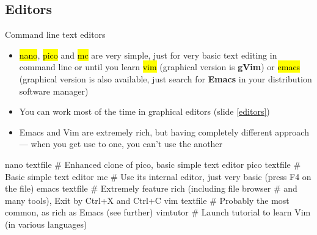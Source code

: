\documentclass[compress, ucs, xelatex, 11pt, xcolor=svgnames,
  hyperref={
    bookmarks=true,
    unicode=true,
    colorlinks=true,
    pdftitle={Linux, command line and MetaCentrum},
    plainpages=false,
    pdfauthor={Vojtech Zeisek},
    pdfsubject={Course about use of Linux command line, writing shell scripts and using MetaCentrum of CESNET},
    pdfcreator={XeLaTeX},
    pdfkeywords={Linux, GNU, BASH, shell, command line, MetaCentrum},
    linkcolor=DarkRed,
    anchorcolor=DarkBlue,
    citecolor=Indigo,
    filecolor=NavyBlue,
    menucolor=DarkMagenta,
    urlcolor=DarkBlue,
    pdftex},
  url={hyphens, lowtilde} %
  ]{beamer}
\renewcommand{\texttt}[1]{\hl{\ttfamily #1}}
\begin{document}
\subsection{Editors} 

\begin{frame}[fragile]{Command line text editors}
  \begin{itemize}
    \item \texttt{nano}, \texttt{pico} and \texttt{mc} are very simple, just for very basic text editing in command line or until you learn \texttt{vim} (graphical version is \textbf{gVim}) or \texttt{emacs} (graphical version is also available, just search for \textbf{Emacs} in your distribution software manager)
    \item You can work most of the time in graphical editors (slide \ref{editors})
    \item Emacs and Vim are extremely rich, but having completely different approach --- when you get use to one, you can't use the another
  \end{itemize}
  \begin{bashcode}
    nano textfile # Enhanced clone of pico, basic simple text editor
    pico textfile # Basic simple text editor
    mc # Use its internal editor, just very basic (press F4 on the file)
    emacs textfile # Extremely feature rich (including file browser
                   # and many tools), Exit by Ctrl+X and Ctrl+C
    vim textfile # Probably the most common, as rich as Emacs (see further)
    vimtutor # Launch tutorial to learn Vim (in various languages)
   \end{bashcode}
\end{frame}
\end{document}
